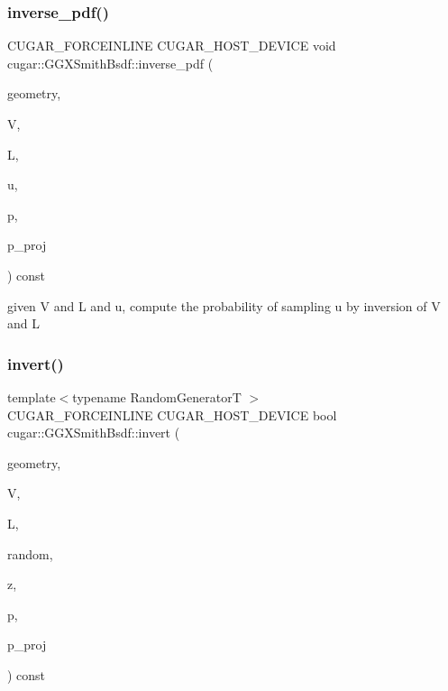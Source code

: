 \subsubsection{\texorpdfstring{inverse\+\_\+pdf()}{inverse\_pdf()}}
{\footnotesize\ttfamily C\+U\+G\+A\+R\+\_\+\+F\+O\+R\+C\+E\+I\+N\+L\+I\+NE C\+U\+G\+A\+R\+\_\+\+H\+O\+S\+T\+\_\+\+D\+E\+V\+I\+CE void cugar\+::\+G\+G\+X\+Smith\+Bsdf\+::inverse\+\_\+pdf (\begin{DoxyParamCaption}\item[{const \hyperlink{structcugar_1_1_differential_geometry}{Differential\+Geometry} \&}]{geometry,  }\item[{const \hyperlink{structcugar_1_1_vector}{Vector3f}}]{V,  }\item[{const \hyperlink{structcugar_1_1_vector}{Vector3f}}]{L,  }\item[{const \hyperlink{structcugar_1_1_vector}{Vector3f}}]{u,  }\item[{float \&}]{p,  }\item[{float \&}]{p\+\_\+proj }\end{DoxyParamCaption}) const\hspace{0.3cm}{\ttfamily [inline]}}

given V and L and u, compute the probability of sampling u by inversion of V and L \mbox{\label{structcugar_1_1_g_g_x_smith_bsdf_a648521001aed72b2ce05694cb0359348}} 
\subsubsection{\texorpdfstring{invert()}{invert()}}
{\footnotesize\ttfamily template$<$typename Random\+GeneratorT $>$ \\
C\+U\+G\+A\+R\+\_\+\+F\+O\+R\+C\+E\+I\+N\+L\+I\+NE C\+U\+G\+A\+R\+\_\+\+H\+O\+S\+T\+\_\+\+D\+E\+V\+I\+CE bool cugar\+::\+G\+G\+X\+Smith\+Bsdf\+::invert (\begin{DoxyParamCaption}\item[{const \hyperlink{structcugar_1_1_differential_geometry}{Differential\+Geometry} \&}]{geometry,  }\item[{const \hyperlink{structcugar_1_1_vector}{Vector3f}}]{V,  }\item[{const \hyperlink{structcugar_1_1_vector}{Vector3f}}]{L,  }\item[{Random\+GeneratorT \&}]{random,  }\item[{\hyperlink{structcugar_1_1_vector}{Vector3f} \&}]{z,  }\item[{float \&}]{p,  }\item[{float \&}]{p\+\_\+proj }\end{DoxyParamCaption}) const\hspace{0.3cm}{\ttfamily [inline]}}

